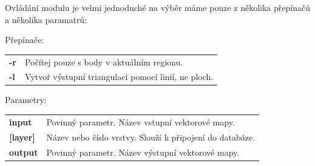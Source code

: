 \documentclass[12pt,a4paper]{article}
\begin{document}
\begin{figure}[h!]
\centering
\begin{floatrow}
\end{floatrow}
\end{figure}

Ovládání modulu je velmi jednoduché na výběr máme pouze z několika
přepínačů a několika paramatrů:

\noindent Přepínače:
\begin{tabular}{ll}
\textbf{-r}& Počítej pouze s body v aktuálním regionu.\\
\textbf{-l}& Vytvoř výstupní triangulaci pomocí linií, ne ploch.\\
\end{tabular}

\noindent Parametry:
\begin{tabular}{ll}
\textbf{input}& Povinný parametr. Název vstupní vektorové mapy.\\
\textbf{[layer]}& Název nebo číslo vrstvy. Slouží k připojení do databáze.\\
\textbf{output}&  Povinný parametr. Název výstupní vektorové mapy.\\
\end{tabular}
\end{document}
